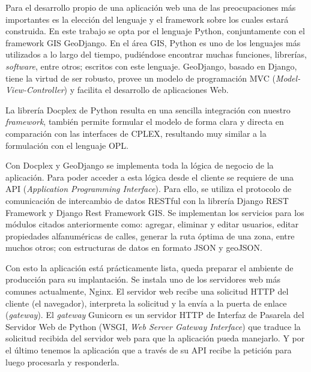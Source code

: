 Para el desarrollo propio de una aplicación web una de las preocupaciones más importantes es la elección del lenguaje y el framework sobre los cuales estará construida. En este trabajo se opta por el lenguaje Python, conjuntamente con el framework GIS GeoDjango. En el área GIS, Python es uno de los lenguajes más utilizados a lo largo del tiempo, pudiéndose encontrar muchas funciones, librerías, \textit{software}, entre otros; escritos con este lenguaje. GeoDjango, basado en Django, tiene la virtud de ser robusto, provee un modelo de programación MVC (\textit{Model-View-Controller}) y facilita el desarrollo de aplicaciones Web.

La librería Docplex de Python resulta en una sencilla integración con nuestro \textit{framework}, también permite formular el modelo de forma clara y directa en comparación con las interfaces de CPLEX, resultando muy similar a la formulación con el lenguaje OPL.

Con Docplex y GeoDjango se implementa toda la lógica de negocio de la aplicación. Para poder acceder a esta lógica desde el cliente se requiere de una API (\textit{Application Programming Interface}). Para ello, se utiliza el protocolo de comunicación de intercambio de datos RESTful con la librería Django REST Framework y Django Rest Framework GIS. Se implementan los servicios para los módulos citados anteriormente como: agregar, eliminar y editar usuarios, editar propiedades alfanuméricas de calles, generar la ruta óptima de una zona, entre muchos otros; con estructuras de datos en formato JSON y geoJSON.

Con esto la aplicación está prácticamente lista, queda preparar el ambiente de producción para su implantación. Se instala uno de los servidores web más comunes actualmente, Nginx. El servidor web recibe una solicitud HTTP del cliente (el navegador), interpreta la solicitud y la envía a la puerta de enlace (\textit{gateway}). El \textit{gateway} Gunicorn es un servidor HTTP de Interfaz de Pasarela del Servidor Web de Python (WSGI, \textit{Web Server Gateway Interface}) que traduce la solicitud recibida del servidor web para que la aplicación pueda manejarlo. Y por el último tenemos la aplicación que a través de su API recibe la petición para luego procesarla y responderla.

